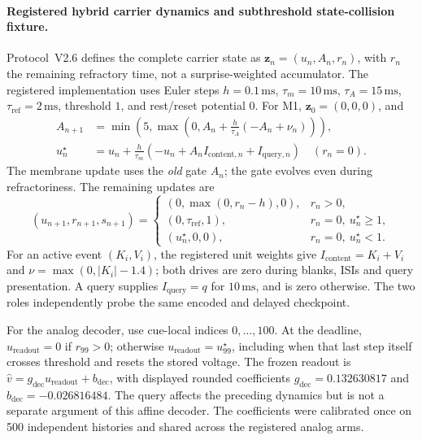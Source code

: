\documentclass{article}
\begin{document}
\paragraph{Registered hybrid carrier dynamics and subthreshold state-collision fixture.}
Protocol~V2.6 defines the complete carrier state as
$\mathbf{z}_n=(u_n,A_n,r_n)$, with $r_n$ the remaining refractory time,
not a surprise-weighted accumulator. The registered implementation uses
Euler steps $h=0.1\,\text{ms}$, $\tau_m=10\,\text{ms}$,
$\tau_A=15\,\text{ms}$, $\tau_{\mathrm{ref}}=2\,\text{ms}$,
threshold $1$, and rest/reset potential $0$. For M1,
$\mathbf{z}_0=(0,0,0)$, and
\begin{equation}
\begin{aligned}
 A_{n+1}&=\min\!\left(5,\max\!\left(0,
 A_n+\frac{h}{\tau_A}(-A_n+\nu_n)\right)\right),\\
 u_n^\star&=u_n+\frac{h}{\tau_m}
 \left(-u_n+A_n I_{\mathrm{content},n}+I_{\mathrm{query},n}\right)
 \quad (r_n=0).
\end{aligned}
\label{eq:p1b_carrier}
\end{equation}
The membrane update uses the \emph{old} gate $A_n$; the gate evolves even
during refractoriness. The remaining updates are
\[
(u_{n+1},r_{n+1},s_{n+1})=
\begin{cases}
 (0,\max(0,r_n-h),0),&r_n>0,\\
 (0,\tau_{\mathrm{ref}},1),&r_n=0,\ u_n^\star\ge1,\\
 (u_n^\star,0,0),&r_n=0,\ u_n^\star<1.
\end{cases}
\]
For an active event $(K_i,V_i)$, the registered unit weights give
$I_{\mathrm{content}}=K_i+V_i$ and
$\nu=\max(0,|K_i|-1.4)$; both drives are zero during blanks, ISIs and
query presentation. A query supplies $I_{\mathrm{query}}=q$ for
$10\,\text{ms}$, and is zero otherwise. The two roles independently probe
the same encoded and delayed checkpoint.

For the analog decoder, use cue-local indices $0,\ldots,100$.
At the deadline, $u_{\mathrm{readout}}=0$ if $r_{99}>0$; otherwise
$u_{\mathrm{readout}}=u_{99}^\star$, including when that last step itself
crosses threshold and resets the stored voltage. The frozen readout is
$\hat v=g_{\mathrm{dec}}u_{\mathrm{readout}}+b_{\mathrm{dec}}$,
with displayed rounded coefficients $g_{\mathrm{dec}}=0.132630817$ and
$b_{\mathrm{dec}}=-0.026816484$. The query affects the preceding dynamics
but is not a separate argument of this affine decoder. The coefficients
were calibrated once on 500 independent histories and shared across
the registered analog arms.
\end{document}
